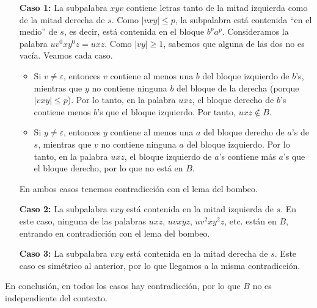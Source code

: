 \documentclass[twoside]{article}
\begin{document}
\begin{itemize}
\item[\textbf{Caso 1:}] La subpalabra $xyv$ contiene letras tanto de la mitad izquierda como de la mitad derecha de $s$. Como $|vxy|\leq p$, la subpalabra está contenida ``en el medio'' de $s$, es decir, está contenida en el bloque $b^pa^p$. Consideramos la palabra $uv^0xy^0z=uxz$. Como $|vy|\geq 1$, sabemos que alguna de las dos no es vacía. Veamos cada caso.
\begin{itemize}
\item Si $v\neq\varepsilon$, entonces $v$ contiene al menos una $b$ del bloque izquierdo de $b$'s, mientras que $y$ no contiene ninguna $b$ del bloque de la derecha (porque $|vxy|\leq p$). Por lo tanto, en la palabra $uxz$, el bloque derecho de $b$'s contiene menos $b$'s que el bloque izquierdo. Por tanto, $uxz\notin B$.
\item Si $y\neq\varepsilon$, entonces $y$ contiene al menos una $a$ del bloque derecho de $a$'s de $s$, mientras que $v$ no contiene ninguna $a$ del bloque izquierdo. Por lo tanto, en la palabra $uxz$, el bloque izquierdo de $a$'s contiene más $a$'s que el bloque derecho, por lo que no está en $B$. 
\end{itemize}
En ambos casos tenemos contradicción con el lema del bombeo.

\item[\textbf{Caso 2:}] La subpalabra $vxy$ está contenida en la mitad izquierda de $s$. En este caso, ninguna de las palabras $uxz$, $uvxyz$, $uv^2xy^2z$, etc. están en $B$, entrando en contradicción con el lema del bombeo.

\item[\textbf{Caso 3:}] La subpalabra $vxy$ está contenida en la mitad derecha de $s$. Este caso es simétrico al anterior, por lo que llegamos a la misma contradicción. 
\end{itemize}
En conclusión, en todos los casos hay contradicción, por lo que $B$ no es independiente del contexto.

\newpage
\end{document}
